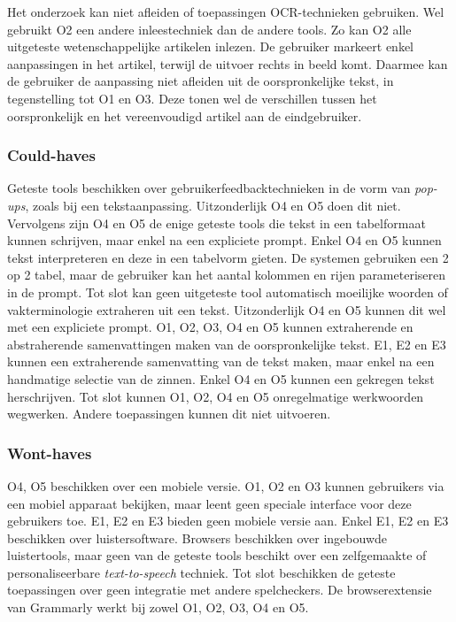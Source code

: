 Het onderzoek kan niet afleiden of toepassingen OCR-technieken gebruiken. Wel gebruikt O2 een andere inleestechniek dan de andere tools. Zo kan O2 alle uitgeteste wetenschappelijke artikelen inlezen. De gebruiker markeert enkel aanpassingen in het artikel, terwijl de uitvoer rechts in beeld komt. Daarmee kan de gebruiker de aanpassing niet afleiden uit de oorspronkelijke tekst, in tegenstelling tot O1 en O3. Deze tonen wel de verschillen tussen het oorspronkelijk en het vereenvoudigd artikel aan de eindgebruiker.

\subsubsection{Could-haves}

Geteste tools beschikken over gebruikerfeedbacktechnieken in de vorm van \textit{pop-ups}, zoals bij een tekstaanpassing. Uitzonderlijk O4 en O5 doen dit niet. Vervolgens zijn O4 en O5 de enige geteste tools die tekst in een tabelformaat kunnen schrijven, maar enkel na een expliciete prompt. Enkel O4 en O5 kunnen tekst interpreteren en deze in een tabelvorm gieten. De systemen gebruiken een 2 op 2 tabel, maar de gebruiker kan het aantal kolommen en rijen parameteriseren in de prompt. Tot slot kan geen uitgeteste tool automatisch moeilijke woorden of vakterminologie extraheren uit een tekst. Uitzonderlijk O4 en O5 kunnen dit wel met een expliciete prompt. O1, O2, O3, O4 en O5 kunnen extraherende en abstraherende samenvattingen maken van de oorspronkelijke tekst. E1, E2 en E3 kunnen een extraherende samenvatting van de tekst maken, maar enkel na een handmatige selectie van de zinnen. Enkel O4 en O5 kunnen een gekregen tekst herschrijven. Tot slot kunnen O1, O2, O4 en O5 onregelmatige werkwoorden wegwerken. Andere toepassingen kunnen dit niet uitvoeren.

\subsubsection{Wont-haves}

O4, O5 beschikken over een mobiele versie. O1, O2 en O3 kunnen gebruikers via een mobiel apparaat bekijken, maar leent geen speciale interface voor deze gebruikers toe. E1, E2 en E3 bieden geen mobiele versie aan. Enkel E1, E2 en E3 beschikken over luistersoftware. Browsers beschikken over ingebouwde luistertools, maar geen van de geteste tools beschikt over een zelfgemaakte of personaliseerbare \textit{text-to-speech} techniek. Tot slot beschikken de geteste toepassingen over geen integratie met andere spelcheckers. De browserextensie van Grammarly werkt bij zowel O1, O2, O3, O4 en O5.

